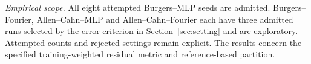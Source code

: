 \emph{Empirical scope.}
All eight attempted Burgers--MLP seeds are admitted. Burgers--Fourier,
Allen--Cahn--MLP and Allen--Cahn--Fourier each have three admitted runs selected
by the error criterion in Section~\ref{sec:setting} and are exploratory.
Attempted counts and rejected settings remain explicit. The results concern the
specified training-weighted residual metric and reference-based partition.
